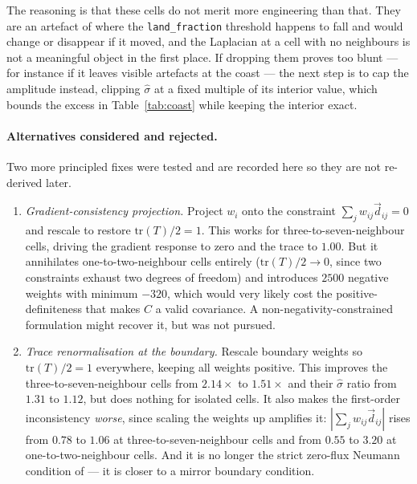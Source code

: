 \documentclass[11pt]{article}
\newcommand{\shat}{\hat{\sigma}}
\begin{document}
The reasoning is that these cells do not merit more engineering than that. They are an
artefact of where the \texttt{land\_fraction} threshold happens to fall and would change
or disappear if it moved, and the Laplacian at a cell with no neighbours is not a
meaningful object in the first place. If dropping them proves too blunt --- for instance
if it leaves visible artefacts at the coast --- the next step is to cap the amplitude
instead, clipping $\shat$ at a fixed multiple of its interior value, which bounds the
excess in Table~\ref{tab:coast} while keeping the interior exact.

\paragraph{Alternatives considered and rejected.} Two more principled fixes were tested
and are recorded here so they are not re-derived later.

\begin{enumerate}
  \item \emph{Gradient-consistency projection.} Project $w_i$ onto the constraint
  $\sum_j w_{ij}\vec{d}_{ij} = 0$ and rescale to restore $\mathrm{tr}(T)/2 = 1$. This
  works for three-to-seven-neighbour cells, driving the gradient response to zero and the
  trace to $1.00$. But it annihilates one-to-two-neighbour cells entirely
  ($\mathrm{tr}(T)/2 \to 0$, since two constraints exhaust two degrees of freedom) and
  introduces $2500$ negative weights with minimum $-320$, which would very likely cost
  the positive-definiteness that makes $C$ a valid covariance. A non-negativity-constrained
  formulation might recover it, but was not pursued.

  \item \emph{Trace renormalisation at the boundary.} Rescale boundary weights so
  $\mathrm{tr}(T)/2 = 1$ everywhere, keeping all weights positive. This improves the
  three-to-seven-neighbour cells from $2.14\times$ to $1.51\times$ and their $\shat$ ratio
  from $1.31$ to $1.12$, but does nothing for isolated cells. It also makes the first-order
  inconsistency \emph{worse}, since scaling the weights up amplifies it:
  $\left|\sum_j w_{ij}\vec{d}_{ij}\right|$ rises from $0.78$ to $1.06$ at
  three-to-seven-neighbour cells and from $0.55$ to $3.20$ at one-to-two-neighbour cells.
  And it is no longer the strict zero-flux Neumann condition of \citet{smith2022} --- it
  is closer to a mirror boundary condition.
\end{enumerate}
\end{document}

